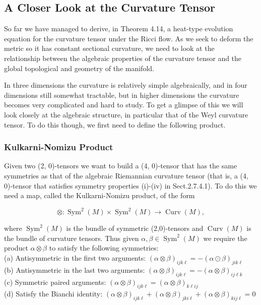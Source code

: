 \documentclass[10pt, letterpaper]{article}
\begin{document}
\subsection*{A Closer Look at the Curvature Tensor}
So far we have managed to derive, in Theorem 4.14, a heat-type evolution equation for the curvature tensor under the Ricci flow. As we seek to deform the metric so it has constant sectional curvature, we need to look at the\\
relationship between the algebraic properties of the curvature tensor and the global topological and geometry of the manifold.

In three dimensions the curvature is relatively simple algebraically, and in four dimensions still somewhat tractable, but in higher dimensions the curvature becomes very complicated and hard to study. To get a glimpse of this we will look closely at the algebraic structure, in particular that of the Weyl curvature tensor. To do this though, we first need to define the following product.

\subsubsection*{Kulkarni-Nomizu Product}
Given two (2, 0)-tensors we want to build a (4, 0)-tensor that has the same symmetries as that of the algebraic Riemannian curvature tensor (that is, a (4, 0)-tensor that satisfies symmetry properties (i)-(iv) in Sect.2.7.4.1). To do this we need a map, called the Kulkarni-Nomizu product, of the form

$$
\otimes: \operatorname{Sym}^{2}(M) \times \operatorname{Sym}^{2}(M) \rightarrow \operatorname{Curv}(M),
$$

where $\operatorname{Sym}^{2}(M)$ is the bundle of symmetric (2,0)-tensors and $\operatorname{Curv}(M)$ is the bundle of curvature tensors. Thus given $\alpha, \beta \in \operatorname{Sym}^{2}(M)$ we require the product $\alpha \otimes \beta$ to satisfy the following symmetries:\\
(a) Antisymmetric in the first two arguments: $(\alpha \otimes \beta)_{i j k \ell}=-(\alpha \odot \beta)_{j i k \ell}$\\
(b) Antisymmetric in the last two arguments: $(\alpha \otimes \beta)_{i j k \ell}=-(\alpha \otimes \beta)_{i j \ell k}$\\
(c) Symmetric paired arguments: $(\alpha \otimes \beta)_{i j k \ell}=(\alpha \otimes \beta)_{k \ell i j}$\\
(d) Satisfy the Bianchi identity: $(\alpha \otimes \beta)_{i j k \ell}+(\alpha \otimes \beta)_{j k i \ell}+(\alpha \otimes \beta)_{k i j \ell}=0$
\end{document}
